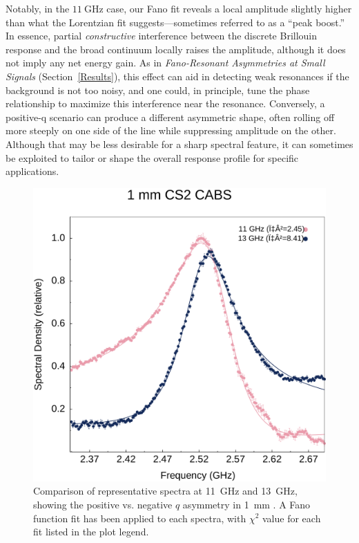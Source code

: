 Notably, in the \(\SI{11}{\giga\hertz}\) case, our Fano fit reveals a local amplitude slightly higher than what the Lorentzian fit suggests—sometimes referred to as a “peak boost.” In essence, partial \emph{constructive} interference between the discrete Brillouin response and the broad continuum locally raises the amplitude, although it does not imply any net energy gain. As in \textit{Fano-Resonant Asymmetries at Small Signals} (Section~\ref{Results}), this effect can aid in detecting weak resonances if the background is not too noisy, and one could, in principle, tune the phase relationship to maximize this interference near the resonance. Conversely, a positive-q scenario can produce a different asymmetric shape, often rolling off more steeply on one side of the line while suppressing amplitude on the other. Although that may be less desirable for a sharp spectral feature, it can sometimes be exploited to tailor or shape the overall response profile for specific applications.

\begin{figure}[ht]
  \centering
  \includegraphics[width=\textwidth]{figs/4-CABS/CS2FanoCompare.pdf}
  \caption{Comparison of representative spectra at \SI{11}{\giga\hertz} and \SI{13}{\giga\hertz}, showing the positive vs. negative \(q\) asymmetry in \SI{1}{\milli\meter} . A Fano function fit has been applied to each spectra, with \(\chi^{2}\) value for each fit listed in the plot legend.}
  \label{fig:CS2FanoCompare}
\end{figure}

